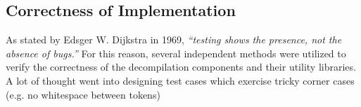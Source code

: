 
\subsection{Correctness of Implementation}


As stated by Edsger W. Dijkstra in 1969, \textit{``testing shows the presence, not the absence of bugs.''} \cite{absence_of_bugs_quote} For this reason, several independent methods were utilized to verify the correctness of the decompilation components and their utility libraries. A lot of thought went into designing test cases which exercise tricky corner cases (e.g. no whitespace between tokens)




